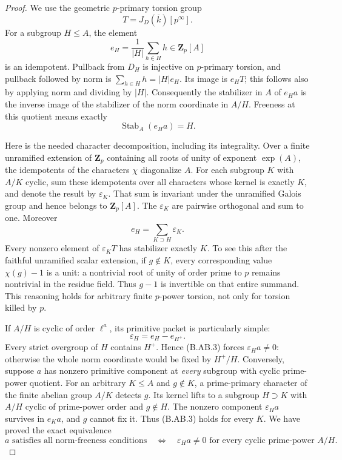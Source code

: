 \documentclass[11pt,a4paper]{article}
\begin{document}
\begin{proof}
We use the geometric $p$-primary torsion group
\[
                   T=J_D(\overline k)[p^\infty].
\]
For a subgroup $H\le A$, the element
\[
                   e_H=\frac1{|H|}\sum_{h\in H}h
                         \in\mathbf Z_p[A]
\]
is an idempotent. Pullback from $D_H$ is injective on
$p$-primary torsion, and pullback followed by norm is
$\sum_{h\in H}h=|H|e_H$. Its image is $e_HT$; this follows
also by applying norm and dividing by $|H|$. Consequently
the stabilizer in $A$ of $e_Ha$ is the inverse image of the
stabilizer of the norm coordinate in $A/H$. Freeness at this
quotient means exactly
\[
                         \operatorname{Stab}_A(e_Ha)=H.         \tag{B.AB.3}
\]

Here is the needed character decomposition, including its
integrality. Over a finite unramified extension of $\mathbf Z_p$
containing all roots of unity of exponent $\exp(A)$, the
idempotents of the characters $\chi$ diagonalize $A$.
For each subgroup $K$ with $A/K$ cyclic, sum these idempotents
over all characters whose kernel is exactly $K$, and denote
the result by $\varepsilon_K$. That sum is invariant under
the unramified Galois group and hence belongs to
$\mathbf Z_p[A]$. The $\varepsilon_K$ are pairwise orthogonal
and sum to one. Moreover
\[
       e_H=\sum_{K\supset H}\varepsilon_K.                     \tag{B.AB.4}
\]
Every nonzero element of $\varepsilon_KT$ has stabilizer
exactly $K$. To see this after the faithful unramified scalar
extension, if $g\notin K$, every corresponding value
$\chi(g)-1$ is a unit: a nontrivial root of unity of order
prime to $p$ remains nontrivial in the residue field. Thus
$g-1$ is invertible on that entire summand. This reasoning
holds for arbitrary finite $p$-power torsion, not only for
torsion killed by $p$.

If $A/H$ is cyclic of order $\ell^a$, its primitive packet is
particularly simple:
\[
                         \varepsilon_H=e_H-e_{H^+}.            \tag{B.AB.5}
\]
Every strict overgroup of $H$ contains $H^+$. Hence (B.AB.3)
forces $\varepsilon_Ha\ne0$: otherwise the whole norm
coordinate would be fixed by $H^+/H$. Conversely, suppose
$a$ has nonzero primitive component at \emph{every} subgroup
with cyclic prime-power quotient. For an arbitrary $K\le A$
and $g\notin K$, a prime-primary character of the finite
abelian group $A/K$ detects $g$. Its kernel lifts to a subgroup
$H\supset K$ with $A/H$ cyclic of prime-power order and
$g\notin H$. The nonzero component $\varepsilon_Ha$ survives
in $e_Ka$, and $g$ cannot fix it. Thus (B.AB.3) holds for
every $K$. We have proved the exact equivalence
\[
 a\text{ satisfies all norm-freeness conditions}
 \quad\Longleftrightarrow\quad
 \varepsilon_Ha\ne0\text{ for every cyclic prime-power }A/H.
                                                                  \tag{B.AB.6}
\]


\end{proof}
\end{document}
